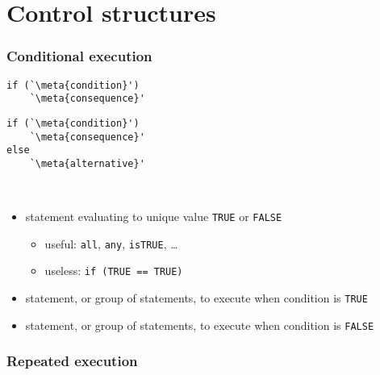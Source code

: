 \section{Control structures}

\begin{frame}[fragile=singleslide]
  \frametitle{Conditional execution}

  \begin{minipage}{\linewidth}
    \begin{minipage}[t]{0.48\linewidth}
      \begin{Schunk}
\begin{lstlisting}
if (`\meta{condition}')
    `\meta{consequence}'
\end{lstlisting}
      \end{Schunk}
    \end{minipage}
    \hfill
    \begin{minipage}[t]{0.48\linewidth}
      \begin{Schunk}
\begin{lstlisting}
if (`\meta{condition}')
    `\meta{consequence}'
else
    `\meta{alternative}'
\end{lstlisting}
      \end{Schunk}
    \end{minipage} \\
    \mbox{}
  \end{minipage}
  \begin{itemize}
  \item {} statement evaluating to \alert{unique} value
    \texttt{TRUE} or \texttt{FALSE}
    \begin{itemize}
    \item useful: \verb=all=, \verb=any=,
      \verb=isTRUE=, \dots
    \item useless: \verb|if (TRUE == TRUE)|
    \end{itemize}
  \item {} statement, or group of statements, to execute
    when condition is \texttt{TRUE}
  \item {} statement, or group of statements, to execute
    when condition is \texttt{FALSE}
  \end{itemize}
\end{frame}

\begin{frame}
  \frametitle{Repeated execution}

\end{frame}

